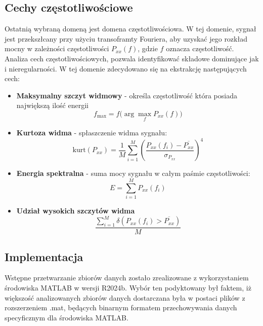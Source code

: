 \documentclass[a4paper,twoside,12pt]{book}
\begin{document}
\subsection{Cechy częstotliwościowe}
Ostatnią wybraną domeną jest domena częstotliwościowa. W tej domenie, sygnał jest przekszłcany przy użyciu transoframty Fouriera, aby uzyskać jego rozkład mocny w zależności częstotliwości $P_{xx}(f)$, gdzie $f$ oznacza częstotliwość. Analiza cech częstotliwościowych, pozwala identyfikować składowe dominujące jak i nieregularności. W tej domenie zdecydowano się na ekstrakcję następujących cech:
\begin{itemize}
	\setcounter{enumi}{9}
	\item \textbf{Maksymalny szczyt widmowy} - określa częstotliwość która posiada największą ilość energii
	      \begin{equation}
		      f_{\max} = f \bigl( \arg\max_{f} P_{xx}(f) \bigr)
	      \end{equation}


	\item \textbf{Kurtoza widma} - spłaszczenie widma sygnału:
	      \begin{equation}
		      \text{kurt}(P_{xx}) = \frac{1}{M} \sum_{i=1}^M \left( \frac{P_{xx}(f_i) - \overline{P_{xx}}}{\sigma_{P_{xx}}} \right)^4
	      \end{equation}

	\item \textbf{Energia spektralna} - suma mocy sygnału w całym paśmie częstotliwości:
	      \begin{equation}
		      E = \sum_{i=1}^{M} P_{xx}(f_i)
	      \end{equation}

	\item \textbf{Udział wysokich szczytów widma}
	      \begin{equation}
		      \frac{\sum_{i=1}^{M} \delta(P_{xx}(f_i) > \overline{P_{xx}} )}{M}
	      \end{equation}
\end{itemize}

\subsection{Implementacja}
Wstępne przetwarzanie zbiorów danych zostało zrealizowane z wykorzystaniem środowiska MATLAB w wersji R2024b. Wybór ten podyktowany był faktem, iż większość analizowanych zbiorów danych dostarczana była w postaci plików z rozszerzeniem .mat, będących binarnym formatem przechowywania danych specyficznym dla środowiska MATLAB.\\
\end{document}
